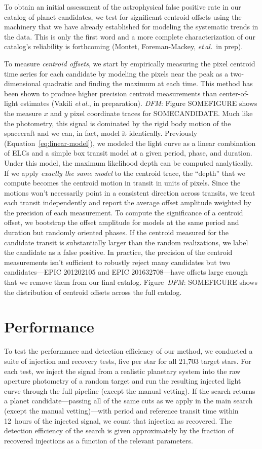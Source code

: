 \documentclass[12pt,preprint]{aastex}
\newcommand{\foreign}[1]{\emph{#1}}
\newcommand{\etal}{\foreign{et\,al.}}
\newcommand{\eqalt}[1]{Equation~\ref{eq:#1}}
\newcommand{\sectlabel}[1]{\label{sect:#1}}
\newcommand{\todo}[3]{{\color{#2}\emph{#1}: #3}}
\newcommand{\dfmtodo}[1]{\todo{DFM}{red}{#1}}
\begin{document}
To obtain an initial assessment of the astrophysical false positive rate in
our catalog of planet candidates, we test for significant centroid offsets
using the machinery that we have already established for modeling the
systematic trends in the data.
This is only the first word and a more complete characterization of our
catalog's reliability is forthcoming (Montet, Foreman-Mackey, \etal\ in prep).

To measure \emph{centroid offsets}, we start by empirically measuring the
pixel centroid time series for each candidate by modeling the pixels near the
peak as a two-dimensional quadratic and finding the maximum at each time.
This method has been shown to produce higher precision centroid measurements
than center-of-light estimates (Vakili \etal, in preparation).
\dfmtodo{Figure SOMEFIGURE shows the measure $x$ and $y$ pixel coordinate traces for
SOMECANDIDATE.}
Much like the photometry, this signal is dominated by the rigid body motion
of the spacecraft and we can, in fact, model it identically.
Previously (\eqalt{linear-model}), we modeled the light curve as a linear
combination of ELCs and a simple box transit model at a given period, phase,
and duration.
Under this model, the maximum likelihood depth can be computed analytically.
If we apply \emph{exactly the same model} to the centroid trace, the ``depth''
that we compute becomes the centroid motion in transit in units of pixels.
Since the motions won't necessarily point in a consistent direction across
transits, we treat each transit independently and report the average offset
amplitude weighted by the precision of each measurement.
To compute the significance of a centroid offset, we bootstrap the offset
amplitude for models at the same period and duration but randomly oriented
phases.
If the centroid measured for the candidate transit is substantially larger
than the random realizations, we label the candidate as a false positive.
In practice, the precision of the centroid measurements isn't sufficient to
robustly reject many candidates but two candidates---EPIC 201202105 and EPIC
201632708---have offsets large enough that we remove them from our final
catalog.
Figure~\dfmtodo{SOMEFIGURE} shows the distribution of centroid offsets across the full
catalog.


\section{Performance}
\sectlabel{perform}

To test the performance and detection efficiency of our method, we conducted a
suite of injection and recovery tests, five per
star for all 21,703 target stars.
For each test, we inject the signal from a realistic planetary system into the
raw aperture photometry of a random target and run the resulting injected light curve
through the full pipeline (except the manual vetting).
If the search returns a planet candidate---passing all of the same cuts as we
apply in the main search (except the manual vetting)---with period and
reference transit time within 12~hours of the injected signal, we count that
injection as recovered.
The detection efficiency of the search is given approximately by the fraction
of recovered injections as a function of the relevant parameters.
\end{document}
